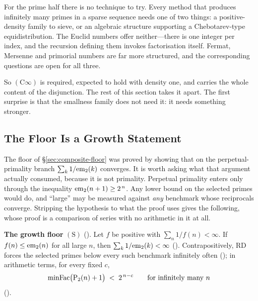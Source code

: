 For the prime half there is no technique to try.  Every method that
produces infinitely many primes in a sparse sequence needs one of two
things: a positive-density family to sieve, or an algebraic structure
supporting a Chebotarev-type equidistribution.  The Euclid numbers offer
neither---there is one integer per index, and the recursion defining them
invokes factorisation itself.  Fermat, Mersenne and primorial numbers are
far more structured, and the corresponding questions are open for all
three.

\smallskip\noindent
So $(\mathrm{C}\infty)$ is required, expected to hold with density one, and
carries the whole content of the disjunction.  The rest of this section
takes it apart.  The first surprise is that the smallness family does not
need it: it needs something stronger.

\subsection{The Floor Is a Growth Statement}
\label{sec:growth-floor}

The floor of \S\ref{sec:composite-floor} was proved by showing that on the
perpetual-primality branch $\sum_k 1/\mathrm{em}_{2}(k)$ converges.  It is worth
asking what that argument actually consumed, because it is not primality.
Perpetual primality enters only through the inequality
$\mathrm{em}_{2}(n+1) \geq 2^{\,n}$.  Any lower bound on the selected primes
would do, and ``large'' may be measured against \emph{any} benchmark
whose reciprocals converge.  Stripping the hypothesis to what the proof
uses gives the following, whose proof is a comparison of series with no
arithmetic in it at all.

\begin{keyresult}
\textbf{The growth floor} $(\mathrm{S})$
().
Let $f$ be positive with $\sum_n 1/f(n) < \infty$.  If
$f(n) \leq \mathrm{em}_{2}(n)$ for all large $n$, then
$\sum_k 1/\mathrm{em}_{2}(k) < \infty$
().
Contrapositively, $\mathrm{RD}$ forces the selected primes below every
such benchmark infinitely often
(); in
arithmetic terms, for every fixed $c$,
\[
  \mathrm{minFac}\bigl(\mathrm{P}_{2}(n)+1\bigr) \;<\; 2^{\,n-c}
  \qquad\text{for infinitely many } n
\]
().
\end{keyresult}


